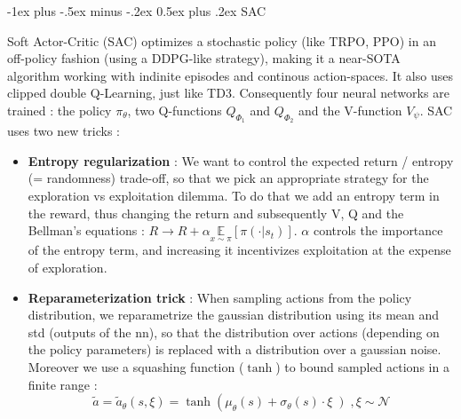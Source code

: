 \documentclass[10pt,landscape]{article}
\makeatletter
\renewcommand{\section}{\@startsection{section}{1}{0mm}%
                                {-1ex plus -.5ex minus -.2ex}%
                                {0.5ex plus .2ex}%
                                {\normalfont\large\bfseries}}
\makeatother
\begin{document}
\begin{multicols}{3}
\section{SAC}

Soft Actor-Critic (SAC) optimizes a stochastic policy (like TRPO, PPO) in an off-policy fashion (using a DDPG-like strategy), making it a near-SOTA algorithm working with indinite episodes and continous action-spaces.
It also uses clipped double Q-Learning, just like TD3. Consequently four neural networks are trained : the policy $\pi_\theta$, two Q-functions $Q_{\Phi_1}$ and $Q_{\Phi_2}$ and the V-function $V_\psi$. 
SAC uses two new tricks :

\begin{itemize}[leftmargin=*]
    \item \textbf{Entropy regularization} :  We want to control the expected return / entropy (= randomness) trade-off, so that we pick an appropriate strategy for the exploration vs exploitation dilemma. To do that we add an entropy term in the reward, thus changing the return and subsequently V, Q and the Bellman's equations : $R \rightarrow R + \alpha \underset{x \sim \pi}{\mathbb{E}} \left [ \pi(\cdot | s_t) \right ]$. $\alpha$ controls the importance of the entropy term, and increasing it incentivizes exploitation at the expense of exploration.
    \item \textbf{Reparameterization trick} : When sampling actions from the policy distribution, we reparametrize the gaussian distribution using its mean and std (outputs of the nn), so that the distribution over actions (depending on the policy parameters) is replaced with a distribution over a gaussian noise. Moreover we use a squashing function ($\tanh$) to bound sampled actions in a finite range : 
    $$\tilde{a} = \tilde{a}_\theta(s, \xi) = \tanh \left ( \mu_\theta(s) + \sigma_\theta(s) \cdot \xi \left ), \xi \sim \mathcal{N}$$
\end{itemize}



\end{multicols}
\end{document}
